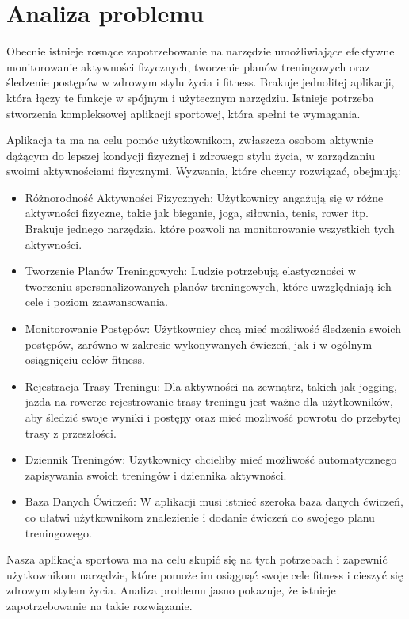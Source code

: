 \newpage
\section{Analiza problemu}		%

Obecnie istnieje rosnące zapotrzebowanie na narzędzie umożliwiające efektywne monitorowanie aktywności fizycznych, tworzenie planów treningowych oraz śledzenie postępów w zdrowym stylu życia i fitness. Brakuje jednolitej aplikacji, która łączy te funkcje w spójnym i użytecznym narzędziu. Istnieje potrzeba stworzenia kompleksowej aplikacji sportowej, która spełni te wymagania.

Aplikacja ta ma na celu pomóc użytkownikom, zwłaszcza osobom aktywnie dążącym do lepszej kondycji fizycznej i zdrowego stylu życia, w zarządzaniu swoimi aktywnościami fizycznymi. Wyzwania, które chcemy rozwiązać, obejmują:

\begin{itemize}
    \item Różnorodność Aktywności Fizycznych: Użytkownicy angażują się w różne aktywności fizyczne, takie jak bieganie, joga, siłownia, tenis, rower itp. Brakuje jednego narzędzia, które pozwoli na monitorowanie wszystkich tych aktywności.

    \item Tworzenie Planów Treningowych: Ludzie potrzebują elastyczności w tworzeniu spersonalizowanych planów treningowych, które uwzględniają ich cele i poziom zaawansowania.

    \item Monitorowanie Postępów: Użytkownicy chcą mieć możliwość śledzenia swoich postępów, zarówno w zakresie wykonywanych ćwiczeń, jak i w ogólnym osiągnięciu celów fitness.

    \item Rejestracja Trasy Treningu: Dla aktywności na zewnątrz, takich jak jogging, jazda na rowerze rejestrowanie trasy treningu jest ważne dla użytkowników, aby śledzić swoje wyniki i postępy oraz mieć możliwość powrotu do przebytej trasy z przeszłości.

    \item Dziennik Treningów: Użytkownicy chcieliby mieć możliwość automatycznego zapisywania swoich treningów i dziennika aktywności.

    \item Baza Danych Ćwiczeń: W aplikacji musi istnieć szeroka baza danych ćwiczeń, co ułatwi użytkownikom znalezienie i dodanie ćwiczeń do swojego planu treningowego.
\end{itemize}

Nasza aplikacja sportowa ma na celu skupić się na tych potrzebach i zapewnić użytkownikom narzędzie, które pomoże im osiągnąć swoje cele fitness i cieszyć się zdrowym stylem życia. Analiza problemu jasno pokazuje, że istnieje zapotrzebowanie na takie rozwiązanie.



